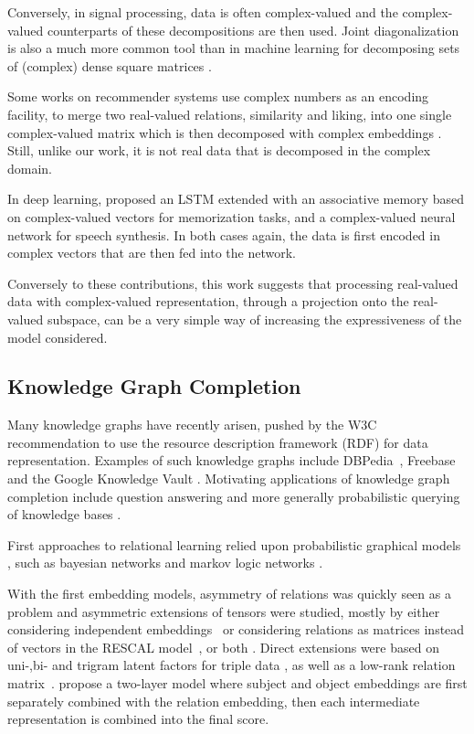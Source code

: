 \documentclass[twoside,11pt]{article}
\renewcommand{\cite}{\citep}
\begin{document}
Conversely, in signal processing, data is often complex-valued \cite{stoica2005spectral}
and the complex-valued counterparts of these decompositions are then used.
Joint diagonalization is also a much more common tool than in machine learning
for decomposing sets of (complex) dense square matrices
\cite{belouchrani1997blind,de2001independent}.

Some works on recommender systems use complex numbers as an encoding facility,
to merge two real-valued relations, 
similarity and liking, into one single complex-valued matrix which is
then decomposed with complex embeddings \cite{kunegis2012online,xie2015link}. 
Still, unlike our work, it is not real
data that is decomposed in the complex domain.

In deep learning, \citet{danihelka2016associative} proposed an LSTM 
extended with an associative memory based on complex-valued vectors for memorization tasks,
and \citet{hu2016initial} a complex-valued neural network
for speech synthesis. In both cases again, the data is first encoded in complex
vectors that are then fed into the network.

Conversely to these contributions, 
this work suggests that processing real-valued data
with complex-valued representation, through a projection
onto the real-valued subspace, can be a very simple way of 
increasing the expressiveness of the model considered.

\subsection{Knowledge Graph Completion}

Many knowledge graphs have recently arisen, pushed by the W3C recommendation
to use the resource description framework (RDF) \cite{cyganiak2014rdf} for 
data representation.
Examples of such knowledge graphs include DBPedia~\cite{dbpedia}, 
Freebase~\cite{Bollacker2008} and the Google Knowledge Vault
\cite{Dong:2014:KnowledgeVault}. Motivating applications of knowledge graph completion
include question answering \cite{bordes2014open} and more generally
probabilistic querying of knowledge bases \cite{huang2009query,krompass2014querying}.

First approaches to relational learning relied upon probabilistic graphical models \cite{Getoor2007}, such as bayesian networks \cite{Friedman1999} and markov 
logic networks \cite{richardson2006markov,raedt2016statistical}.

With the first embedding models, asymmetry of relations was quickly seen as 
a problem and asymmetric extensions of tensors were studied, mostly by either
considering independent embeddings~\cite{franz2009triplerank} or considering relations as
matrices instead of vectors in the RESCAL model~\cite{Nickel2011},
or both \cite{Sutskever2009}.
Direct extensions were based on uni-,bi- and trigram latent factors for triple data \cite{garcia2016combining}, as well as a low-rank relation matrix~\cite{Jenatton2012}.
\citet{bordes2014semantic} propose a two-layer model where subject and object embeddings
are first separately combined with the relation embedding, then each intermediate
representation is combined into the final score.
\end{document}
